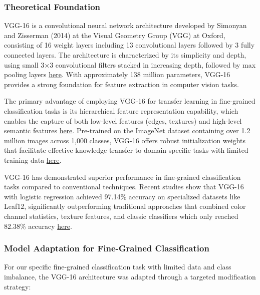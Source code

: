 \documentclass[a4paper,12pt]{article}
\begin{document}
\subsubsection{Theoretical Foundation}
VGG-16 is a convolutional neural network architecture developed by Simonyan and Zisserman (2014) at the Visual Geometry Group (VGG) at Oxford, consisting of 16 weight layers including 13 convolutional layers followed by 3 fully connected layers. The architecture is characterized by its simplicity and depth, using small 3×3 convolutional filters stacked in increasing depth, followed by max pooling layers \href{https://arxiv.org/abs/1409.1556}{here}. With approximately 138 million parameters, VGG-16 provides a strong foundation for feature extraction in computer vision tasks.

The primary advantage of employing VGG-16 for transfer learning in fine-grained classification tasks is its hierarchical feature representation capability, which enables the capture of both low-level features (edges, textures) and high-level semantic features \href{https://proceedings.neurips.cc/paper/2014/file/375c71349b295fbe2dcdca9206f20a06-Paper.pdf}{here}. Pre-trained on the ImageNet dataset containing over 1.2 million images across 1,000 classes, VGG-16 offers robust initialization weights that facilitate effective knowledge transfer to domain-specific tasks with limited training data \href{https://link.springer.com/article/10.1007/s11263-015-0816-y}{here}.

VGG-16 has demonstrated superior performance in fine-grained classification tasks compared to conventional techniques. Recent studies show that VGG-16 with logistic regression achieved 97.14\% accuracy on specialized datasets like Leaf12, significantly outperforming traditional approaches that combined color channel statistics, texture features, and classic classifiers which only reached 82.38\% accuracy \href{https://www.researchgate.net/publication/335846939_Bird_Species_Classification_from_an_Image_Using_VGG-16_Network}{here}.

\subsubsection{Model Adaptation for Fine-Grained Classification}
For our specific fine-grained classification task with limited data and class imbalance, the VGG-16 architecture was adapted through a targeted modification strategy:

\end{document}
